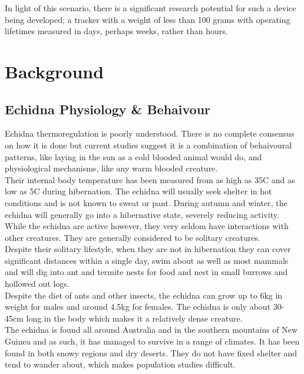 \documentclass[12pt,openany,a4paper]{book}
\begin{document}
In light of this scenario, there is a significant research potential for such a device being developed; a tracker with a weight of less than 100 grams with operating lifetimes measured in days, perhaps weeks, rather than hours.

\chapter{Background}
	\section{Echidna Physiology \& Behaivour}
	Echidna thermoregulation is poorly understood. There is no complete consensus on how it is done \cite{Brice02} but current studies suggest it is a combination of behaivoural patterns, like laying in the sun as a cold blooded animal would do, and physiological mechanisms, like any warm blooded creature.\\ 
	
	Their internal body temperature has been measured from as high as 35\textdegree C and as low as 5\textdegree C during hibernation. The echidna will usually seek shelter in hot conditions and is not known to sweat or pant. During autumn and winter, the echidna will generally go into a hibernative state, severely reducing activity. While the echidna are active however, they very seldom have interactions with other creatures. They are generally considered to be solitary creatures. \\
	
	Despite their solitary lifestyle, when they are not in hibernation they can cover significant distances within a single day, swim about as well as most mammals and will dig into ant and termite nests for food and nest in small burrows and hollowed out logs. \\
	
	Despite the diet of ants and other insects, the echidna can grow up to 6kg in weight for males and around 4.5kg for females. The echidna is only about 30-45cm long in the body which makes it a relatively dense creature. \\

	The echidna is found all around Australia and in the southern mountains of New Guinea and as such, it has managed to survive in a range of climates. It has been found in both snowy regions and dry deserts. They do not have fixed shelter and tend to wander about, which makes population studies difficult. \\
	
\end{document}
